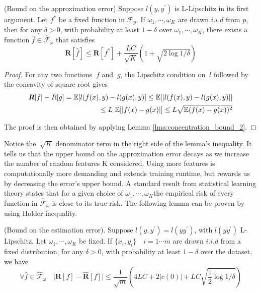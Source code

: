 \documentclass{article}
\begin{document}
\begin{lemma} (Bound on the approximation error) 
    Suppose $l(y, y^{'})$ is L-Lipschitz in its first argument. Let $f^{*}$
    be a fixed function in $\mathcal{F}_p$. If $\omega_1,\cdots, \omega_K$ 
    are drawn $i.i.d$ from $p$, then for any $\delta > 0$, with
    probability at least $1 - \delta$ over $\omega_1, \cdots ,\omega_K$, 
    there exists a function $\hat{f} \in \mathcal{\hat{F}}_\omega$ 
    that satisfies
    \begin{equation*}
        \mathbf{R}[\hat{f}] \leq \mathbf{R}[f^{*}]
            + \frac{LC}{\sqrt{K}} \left(1+\sqrt{2 \log 1/\delta}\right)
    \end{equation*}
    \label{lma:approx_bound}
\end{lemma}

\begin{proof}
    For any two functions $\ f$ and $\ g$, the Lipschitz condition on $\ l$ followed by the concavity of square root gives
    \begin{align*}
        \bm R[f] - R[g] = \mathbb{E} [l(f(x),y) - l(g(x),y)] \leq \mathbb{E}[|l(f(x),y) - l(g(x),y)|] \\
        \leq L\ \mathbb{E}[|f(x) - g(x)|] \leq L\sqrt{\mathbb{E}(f(x)-g(x))^2}
    \end{align*}
    
    The proof is then obtained by applying Lemma \ref{lma:concentration_bound_2}.
\end{proof}

Notice the $\ \sqrt{K}$ denominator term in the right side of the lemma's inequality. It tells us that the upper bound on the approximation error decays as we increase the number of random features K considered. Using more features is computationally more demanding and extends training runtime, but rewards us by decreasing the error's upper bound. A standard result from statistical learning theory states that for a given choice of $\omega_1,\cdots, \omega_K$the empirical risk of every function in $\hat{\mathcal{F}}_\omega$ is close to its true risk. The following lemma can be proven by using Holder inequality.

\begin{lemma}   
    (Bound on the estimation error). Suppose $l(y, y^{'}) = l(yy^{'})$, with $l(yy^{'})$ L-Lipschitz. Let $\omega_1,\cdots, \omega_K$ be fixed. 
    If $\{x_i, y_i\}\quad i=1\cdots m$ are drawn $i.i.d$ from a fixed distribution, 
    for any $\delta > 0$, with probability at least $1 - \delta$
    over the dataset, we have
    \[
    \forall \hat{f} \in \mathcal{\hat{F}}_\omega \quad 
     \big| \mathbf{R}[f]- \mathbf{\hat{R}}[f]\big| \leq \frac{1}{\sqrt{m}} \left(4LC + 2|c(0)| + LC \sqrt{\frac{1}{2} \log 1/\delta}
\right) 
     \]
     \label{lma:estimation_bound}
\end{lemma}
\end{document}
